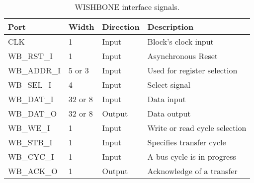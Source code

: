 \begin{table}[!ht]
  \centering
  \begin{tabular}{|l|l|l|l|}
  \hline
  \textbf{Port} & \textbf{Width} & \textbf{Direction} & \textbf{Description}          \\ \hline
  CLK           & 1              & Input              & Block's clock input           \\ \hline
  WB\_RST\_I    & 1              & Input              & Asynchronous Reset            \\ \hline
  WB\_ADDR\_I   & 5 or 3         & Input              & Used for register selection   \\ \hline
  WB\_SEL\_I    & 4              & Input              & Select signal                 \\ \hline
  WB\_DAT\_I    & 32 or 8        & Input              & Data input                    \\ \hline
  WB\_DAT\_O    & 32 or 8        & Output             & Data output                   \\ \hline
  WB\_WE\_I     & 1              & Input              & Write or read cycle selection \\ \hline
  WB\_STB\_I    & 1              & Input              & Specifies transfer cycle      \\ \hline
  WB\_CYC\_I    & 1              & Input              & A bus cycle is in progress    \\ \hline
  WB\_ACK\_O    & 1              & Output             & Acknowledge of a transfer     \\ \hline
  \end{tabular}
  \caption{WISHBONE interface signals.}
  \label{tab:uart16550_wishbone}
\end{table}

